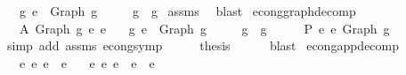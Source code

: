 \begin{isabellebody}
\ \ \ {\isachardoublequoteopen}{\isasymexists}g{\isacharprime}{\kern0pt}{\isachardot}{\kern0pt}\ e{\isacharprime}{\kern0pt}\ {\isacharequal}{\kern0pt}\ Graph\ g{\isacharprime}{\kern0pt}\isanewline
\ \ \ \ {\isasymand}\ g{\isacharprime}{\kern0pt}\ {\isasymsimeq}\ g{\isachardoublequoteclose}\isanewline
%
\isadelimproof
%
\endisadelimproof
%
\isatagproof
{}\isamarkupfalse%
\ assms\ \isamarkupfalse%
\ blast%
\endisatagproof
{\isafoldproof}%
%
\isadelimproof
\isanewline
%
\endisadelimproof
\isanewline
\isanewline
{}\isamarkupfalse%
\ econg{\isacharunderscore}{\kern0pt}graph{\isacharunderscore}{\kern0pt}decomp{}{\isacharcolon}{\kern0pt}\isanewline
\ \ \ A{}{\isacharcolon}{\kern0pt}\ {\isachardoublequoteopen}Graph\ g\ {\isasymsimeq}e\ e{\isacharprime}{\kern0pt}{\isachardoublequoteclose}\isanewline
\ \ \ {\isachardoublequoteopen}{\isasymexists}g{\isacharprime}{\kern0pt}{\isachardot}{\kern0pt}\ e{\isacharprime}{\kern0pt}\ {\isacharequal}{\kern0pt}\ Graph\ g{\isacharprime}{\kern0pt}\isanewline
\ \ \ \ {\isasymand}\ g\ {\isasymsimeq}\ g{\isacharprime}{\kern0pt}{\isachardoublequoteclose}\isanewline
%
\isadelimproof
%
\endisadelimproof
%
\isatagproof
{}\isamarkupfalse%
\ {\isacharminus}{\kern0pt}\isanewline
\ \ \isamarkupfalse%
\ P{}{\isacharcolon}{\kern0pt}\ {\isachardoublequoteopen}e{\isacharprime}{\kern0pt}\ {\isasymsimeq}e\ Graph\ g{\isachardoublequoteclose}\isanewline
\ \ \ \ \isamarkupfalse%
\ {\isacharparenleft}{\kern0pt}simp\ add{\isacharcolon}{\kern0pt}\ assms\ econg{\isacharunderscore}{\kern0pt}symp{\isacharparenright}{\kern0pt}\isanewline
\ \ \isamarkupfalse%
\ \isamarkupfalse%
\ {\isacharquery}{\kern0pt}thesis\isanewline
\ \ \ \ \isamarkupfalse%
\ blast\isanewline
{}\isamarkupfalse%
%
\endisatagproof
{\isafoldproof}%
%
\isadelimproof
\isanewline
%
\endisadelimproof
\isanewline
\isanewline
{}\isamarkupfalse%
\ econg{\isacharunderscore}{\kern0pt}app{\isacharunderscore}{\kern0pt}decomp{\isacharcolon}{\kern0pt}\isanewline
\ \ \ {\isachardoublequoteopen}e{\isacharprime}{\kern0pt}\ {\isasymsimeq}e\ e{}\ {\isasymcdot}\ e{}{\isachardoublequoteclose}\isanewline
\ \ \ {\isachardoublequoteopen}{\isasymexists}e{}{\isacharprime}{\kern0pt}\ e{}{\isacharprime}{\kern0pt}{\isachardot}{\kern0pt}\ e{\isacharprime}{\kern0pt}\ {\isacharequal}{\kern0pt}\ e{}{\isacharprime}{\kern0pt}\ {\isasymcdot}\ e{}{\isacharprime}{\kern0pt}\isanewline

\end{isabellebody}
